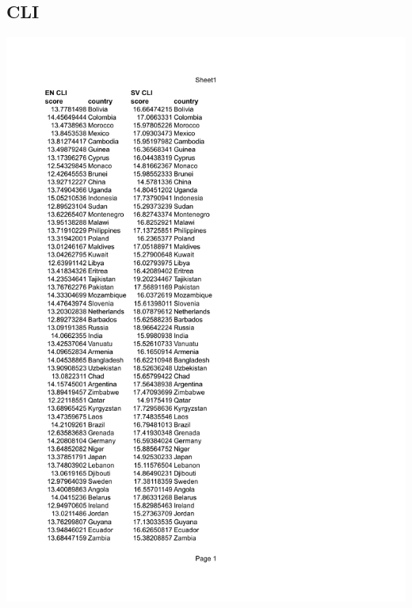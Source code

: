 \documentclass[a4paper]{article}
\begin{document}
\subsection{CLI}
\includegraphics[page=1,scale=0.75]{./DATA/CLI.pdf}
\end{document}
